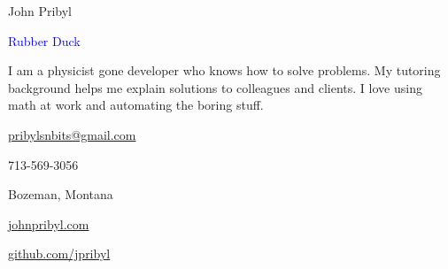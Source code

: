 \documentclass[12pt]{resume}
\begin{document}
    \noindent\begin{minipage}[t]{0.63\textwidth}
        \vspace{-5mm}
        {\par \huge John Pribyl}
        {\par \large \textcolor{blue}{Rubber Duck}}
        \vspace{4pt}
        {\par I am a physicist gone developer who knows how to solve problems.
        My tutoring background helps me explain solutions to colleagues and
        clients. I love using math at work and automating the boring stuff.}
    \end{minipage}
    \begin{minipage}[t]{0.35\textwidth}
        \begin{flushright}
            {\par \textcolor{black}{\href{mailto:pribylsnbits@gmail.com}{pribylsnbits@gmail.com}}}
            {\par 713-569-3056}
            {\par Bozeman, Montana}
            {\par \textcolor{lavender}{\underline{\href{https://www.johnpribyl.com}{johnpribyl.com}}}}
            {\par \textcolor{lavender}{\underline{\href{https://www.github.com/jpribyl}{github.com/jpribyl}}}}
        \end{flushright}
    \end{minipage}
    \begin{minipage}[t]{0.03\textwidth}
        \begin{center}
            {\par \textcolor{black}\faEnvelope} 
            {\par \faMobile} 
            {\par \faMapMarker} 
            {\par \textcolor{lavender}\faGlobe} 
            {\par \textcolor{lavender}\faGithub} 
        \end{center}
        \vspace{.01mm}
    \end{minipage}
    \vspace{-3mm}
    \makebox[\linewidth]{\rule{\paperwidth}{0.2pt}}
\end{document}
